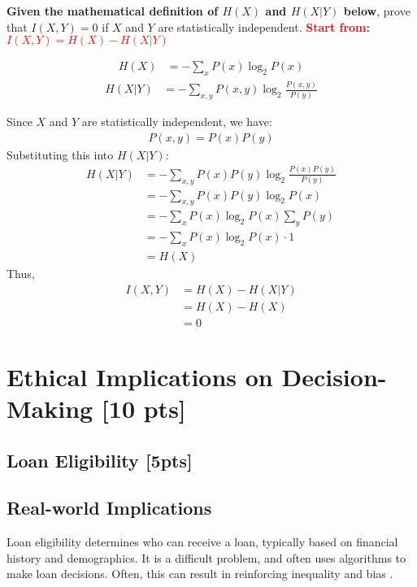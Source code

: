 \documentclass{article}
\begin{document}
\textbf{Given the mathematical definition of $H(X)$ and $H(X|Y)$ below}, prove that $I(X,Y) = 0$ if $X$ and $Y$ are statistically independent.
\newline
\textcolor{red}{\textbf{Start from: $I(X,Y) = H(X)-H(X|Y)$}}

\begin{align*}
    H(X) &= -\sum_{x}P(x)\log_2P(x)
\end{align*}
\begin{align*}
    H(X|Y) &= -\sum_{x,y}P(x,y)\log_2\frac{P(x,y)}{P(y)}
\end{align*}

Since $X$ and $Y$ are statistically independent, we have:
\begin{align*}
    P(x,y) = P(x)P(y)
\end{align*}
Substituting this into $H(X|Y)$:
\begin{align*}
    H(X|Y) &= -\sum_{x,y} P(x)P(y) \log_2 \frac{P(x)P(y)}{P(y)} \\
           &= -\sum_{x,y} P(x)P(y) \log_2 P(x) \\
           &= -\sum_{x} P(x) \log_2 P(x) \sum_{y} P(y) \\
           &= -\sum_{x} P(x) \log_2 P(x) \cdot 1 \\
           &= H(X)
\end{align*}
Thus,
\begin{align*}
    I(X,Y) &= H(X) - H(X|Y) \\
           &= H(X) - H(X) \\
           &= 0
\end{align*}

\newpage

\section{Ethical Implications on Decision-Making [10 pts]}
\subsection{Loan Eligibility [5pts]}
\subsection*{Real-world Implications}
Loan eligibility determines who can receive a loan, typically based on financial history and demographics. It is a difficult problem, and often uses algorithms to make loan decisions. Often, this can result in reinforcing inequality and bias \cite{oneil}.\\
\end{document}
